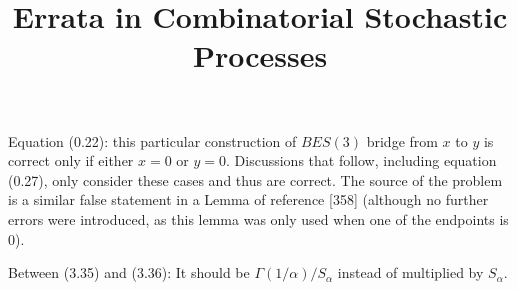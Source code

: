 \documentclass{article}
\title{Errata in Combinatorial Stochastic Processes}
\begin{document}
\maketitle

Equation (0.22): this particular construction of $BES(3)$ bridge from $x$ to $y$ is correct only if either $x = 0$ or $y = 0$. Discussions that follow, including equation (0.27), only consider these cases and thus are correct. The source of the problem is a similar false statement in a Lemma
of reference [358] (although no further errors were introduced, as this lemma was only used when one of the endpoints is 0). 

Between (3.35) and (3.36):  It should be $\Gamma(1/\alpha)/S_\alpha$ instead of multiplied by $S_\alpha$.
\end{document}
